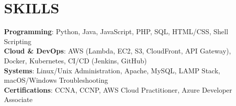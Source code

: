 \documentclass[letterpaper,11pt]{article}
\begin{document}
\section{SKILLS}
 \begin{itemize}[leftmargin=0.15in, label={}]
    \small{\item{
     \textbf{Programming}{: Python, Java, JavaScript, PHP, SQL, HTML/CSS, Shell Scripting} \\
     \textbf{Cloud \& DevOps}{: AWS (Lambda, EC2, S3, CloudFront, API Gateway), Docker, Kubernetes, CI/CD (Jenkins, GitHub)} \\
     \textbf{Systems}{:  Linux/Unix Administration, Apache, MySQL, LAMP Stack, macOS/Windows Troubleshooting} \\
      \textbf{Certifications}{:  CCNA, CCNP, AWS Cloud Practitioner, Azure Developer Associate} \\
     }}
        
 \end{itemize}
 \vspace{-22pt}
\end{document}
